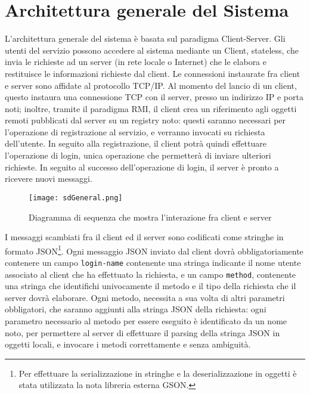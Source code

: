\documentclass{article}
\begin{document}
\section{Architettura generale del Sistema}
L'architettura generale del sistema è basata sul paradigma Client-Server. Gli utenti del servizio possono accedere al sistema mediante un Client, stateless, che invia le richieste ad un server (in rete locale o Internet) che le elabora e restituisce le informazioni richieste dal client. Le connessioni instaurate fra client e server sono affidate al protocollo TCP/IP. Al momento del lancio di un client, questo instaura una connessione TCP con il server, presso un indirizzo IP e porta noti; inoltre, tramite il paradigma RMI, il client crea un riferimento agli oggetti remoti pubblicati dal server su un registry noto: questi saranno necessari per l'operazione di registrazione al servizio, e verranno invocati su richiesta dell'utente. In seguito alla registrazione, il client potrà quindi effettuare l'operazione di login, unica operazione che permetterà di inviare ulteriori richieste. In seguito al successo dell'operazione di login, il server è pronto a ricevere nuovi messaggi.
\begin{figure}[htbp]
    \texttt{[image: sdGeneral.png]}
    \centering
    \caption{\label{fig:sdGeneral}Diagramma di sequenza che mostra l'interazione fra client e server}
\end{figure}
\newpage
I messaggi scambiati fra il client ed il server sono codificati come stringhe in formato JSON\footnote{Per effettuare la serializzazione in stringhe e la deserializzazione in oggetti è stata utilizzata la nota libreria esterna GSON.}.   Ogni messaggio JSON inviato dal client dovrà obbligatoriamente contenere un campo \texttt{login-name} contenente una stringa indicante il nome utente associato al client che ha effettuato la richiesta, e un campo \texttt{method}, contenente una stringa che identifichi univocamente il metodo e il tipo della richiesta che il server dovrà elaborare. Ogni metodo, necessita a sua volta di altri parametri obbligatori, che saranno aggiunti alla stringa JSON della richiesta: ogni parametro necessario al metodo per essere eseguito è identificato da un nome noto, per permettere al server di effettuare il parsing della stringa JSON in oggetti locali, e invocare i metodi correttamente e senza ambiguità. 
\end{document}
